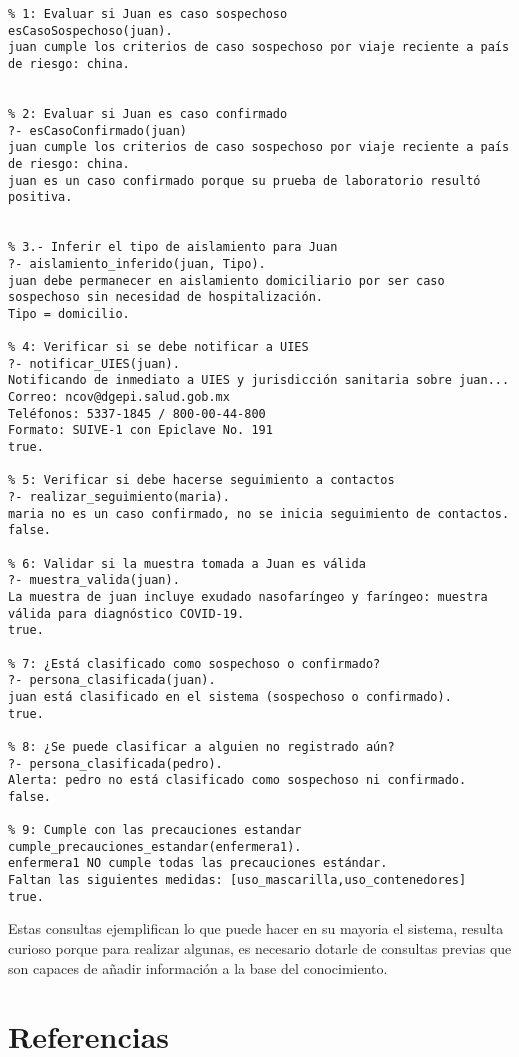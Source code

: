 \documentclass[11pt, letterpaper]{article}
\begin{document}
\begin{verbatim}
% 1: Evaluar si Juan es caso sospechoso
esCasoSospechoso(juan).
juan cumple los criterios de caso sospechoso por viaje reciente a país de riesgo: china.


% 2: Evaluar si Juan es caso confirmado
?- esCasoConfirmado(juan)	
juan cumple los criterios de caso sospechoso por viaje reciente a país de riesgo: china.
juan es un caso confirmado porque su prueba de laboratorio resultó positiva.


% 3.- Inferir el tipo de aislamiento para Juan
?- aislamiento_inferido(juan, Tipo).
juan debe permanecer en aislamiento domiciliario por ser caso sospechoso sin necesidad de hospitalización.
Tipo = domicilio.

% 4: Verificar si se debe notificar a UIES
?- notificar_UIES(juan).
Notificando de inmediato a UIES y jurisdicción sanitaria sobre juan...
Correo: ncov@dgepi.salud.gob.mx
Teléfonos: 5337-1845 / 800-00-44-800
Formato: SUIVE-1 con Epiclave No. 191
true.

% 5: Verificar si debe hacerse seguimiento a contactos
?- realizar_seguimiento(maria).
maria no es un caso confirmado, no se inicia seguimiento de contactos.
false.

% 6: Validar si la muestra tomada a Juan es válida
?- muestra_valida(juan).
La muestra de juan incluye exudado nasofaríngeo y farí­ngeo: muestra válida para diagnóstico COVID-19.
true.

% 7: ¿Está clasificado como sospechoso o confirmado?
?- persona_clasificada(juan).
juan está clasificado en el sistema (sospechoso o confirmado).
true.

% 8: ¿Se puede clasificar a alguien no registrado aún?
?- persona_clasificada(pedro).
Alerta: pedro no está clasificado como sospechoso ni confirmado.
false.

% 9: Cumple con las precauciones estandar
cumple_precauciones_estandar(enfermera1).
enfermera1 NO cumple todas las precauciones estándar.
Faltan las siguientes medidas: [uso_mascarilla,uso_contenedores]
true.
\end{verbatim}

Estas consultas ejemplifican lo que puede hacer en su mayoria el sistema, resulta curioso porque para realizar algunas, es necesario dotarle de consultas previas que son capaces de añadir información a la base del conocimiento.
		
\newpage

\section{Referencias}  %

	
\end{document}
